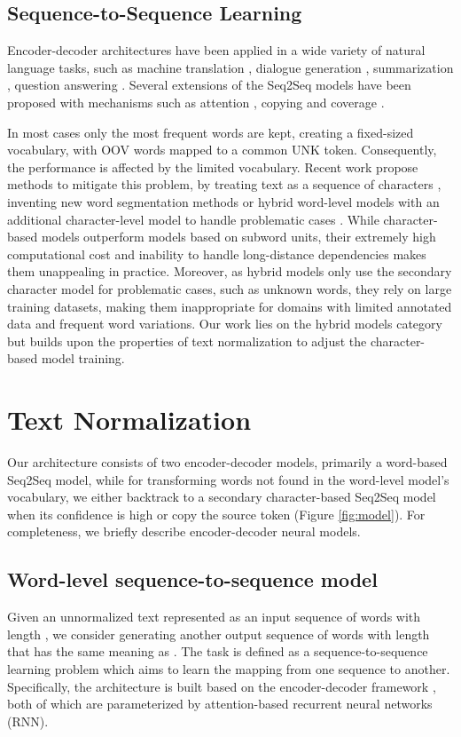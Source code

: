 \documentclass[letterpaper]{article} \usepackage{aaai19}  \usepackage{times}  \usepackage{helvet} \usepackage{courier}  \usepackage[hyphens]{url}  \usepackage{graphicx} \urlstyle{rm} \def\UrlFont{\rm}  \usepackage{graphicx}  \frenchspacing  \setlength{\pdfpagewidth}{8.5in}  \setlength{\pdfpageheight}{11in}
\newcommand{\citep}{\cite}
\begin{document}
\subsection{Sequence-to-Sequence Learning}
Encoder-decoder architectures \citep{sutskever2014sequence,cho2014learning} have been applied in a wide variety of natural language tasks, such as machine translation \citep{wu2016google}, dialogue generation \citep{vinyals2015neural}, summarization \citep{nallapati2016abstractive}, question answering \citep{yin2015neural}. Several extensions of the Seq2Seq models have been proposed with mechanisms such as attention \citep{bahdanau2014neural}, copying \citep{see2017get} and coverage \citep{tu2016modeling}.

In most cases only the most frequent words are kept, creating a fixed-sized vocabulary, with OOV words mapped to a common UNK token. Consequently, the performance is affected by the limited vocabulary. Recent work propose methods to mitigate this problem, by treating text as a sequence of characters \citep{lee2017fully}, inventing new word segmentation methods  \citep{sennrich2015neural,bojanowski2017enriching} or hybrid word-level models with an additional character-level model to handle problematic cases \citep{luong2016achieving,ji2017nested}.  While character-based models outperform models based on subword units, their extremely high computational cost and inability to handle long-distance dependencies makes them unappealing in practice. Moreover, as hybrid models only use the secondary character model for problematic cases, such as unknown words, they rely on large training datasets, making them inappropriate for domains with limited annotated data and frequent word variations. Our work lies on the hybrid models category but builds upon the properties of text normalization to adjust the character-based model training. 

\section{Text Normalization}\label{basic}
Our architecture consists of two encoder-decoder models, primarily a word-based Seq2Seq model, while for transforming words not found in the word-level model's vocabulary, we either backtrack to a secondary character-based Seq2Seq model when its confidence is high or copy the source token (Figure \ref{fig:model}). For completeness, we briefly describe encoder-decoder neural models.

\subsection{Word-level sequence-to-sequence model}
Given an unnormalized text represented as an input sequence of words  with length , we consider generating another output sequence of words  with length  that has the same meaning as .  
The task is defined as a sequence-to-sequence learning problem which aims to learn the mapping from one sequence to another. Specifically, the architecture is built based on the encoder-decoder framework \citep{cho2014learning,sutskever2014sequence}, both of which are parameterized by attention-based recurrent neural networks (RNN). 
\end{document}
